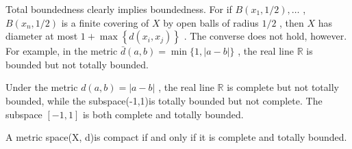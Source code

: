 \begin{example} Total boundedness clearly implies boundedness. For if \(B\left( {{x}_{1},1/2}\right) ,\ldots\) , \(B\left( {{x}_{n},1/2}\right)\) is a finite covering of \(X\) by open balls of radius \(1/2\) , then \(X\) has diameter at most \(1 + \max \left\{  {d\left( {{x}_{i},{x}_{j}}\right) }\right\}\) . The converse does not hold, however. For example, in the metric \(\bar{d}\left( {a,b}\right)  = \min \{ 1,\left| {a - b}\right| \}\) , the real line \(\mathbb{R}\) is bounded but not totally bounded.
\end{example}

\begin{example} Under the metric \(d\left( {a,b}\right)  = \left| {a - b}\right|\) , the real line \(\mathbb{R}\) is complete but not totally bounded, while the subspace(-1,1)is totally bounded but not complete. The subspace \(\left\lbrack  {-1,1}\right\rbrack\) is both complete and totally bounded.
\end{example}

\begin{theorem} A metric space(X, d)is compact if and only if it is complete and totally bounded.
\end{theorem}

